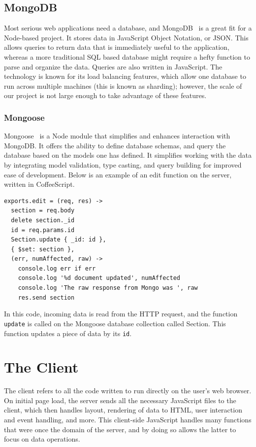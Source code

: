 \documentclass[12pt]{article}
\newcommand{\code}[1]{{\texttt {#1}}}
\begin{document}
\subsection{MongoDB}\label{sec:mongo}
Most serious web applications need a database, and MongoDB~\cite{MongoDB} is a great fit for a Node-based project. 
It stores data in JavaScript Object Notation, or JSON. This allows queries to return data that is immediately useful to the application, whereas a more traditional SQL based database might require a hefty function to parse and organize the data. 
Queries are also written in JavaScript. The technology is known for its  load balancing features, which allow one database to run across multiple machines (this is known as sharding); however, the scale of our project is not large enough to take advantage of these features.

\subsubsection{Mongoose}\label{sec:mongoose}
Mongoose~\cite{Mongoose} is a Node module that simplifies and enhances interaction with MongoDB. 
It offers the ability to define database schemas, and query the database based on the models one has defined. 
It simplifies working with the data by integrating model validation, type casting, and query building for improved ease of development. 
Below is an example of an edit function on the server, written in CoffeeScript.
\begin{verbatim}
exports.edit = (req, res) ->
  section = req.body
  delete section._id
  id = req.params.id
  Section.update { _id: id },
  { $set: section },
  (err, numAffected, raw) ->
    console.log err if err
    console.log '%d document updated', numAffected
    console.log 'The raw response from Mongo was ', raw
    res.send section
\end{verbatim}
In this code, incoming data is read from the HTTP request, and the function \code{update} is called on the Mongoose database collection called Section. 
This function updates a piece of data by its \code{id}.


\section{The Client}\label{sec:client}
The client refers to all the code written to run directly on the user's web browser. 
On initial page load, the server sends all the necessary JavaScript files to the client, which then handles layout, rendering of data to HTML, user interaction and event handling, and more. 
This client-side JavaScript handles many functions that were once the domain of the server, and by doing so allows the latter to focus on data operations.
\end{document}
